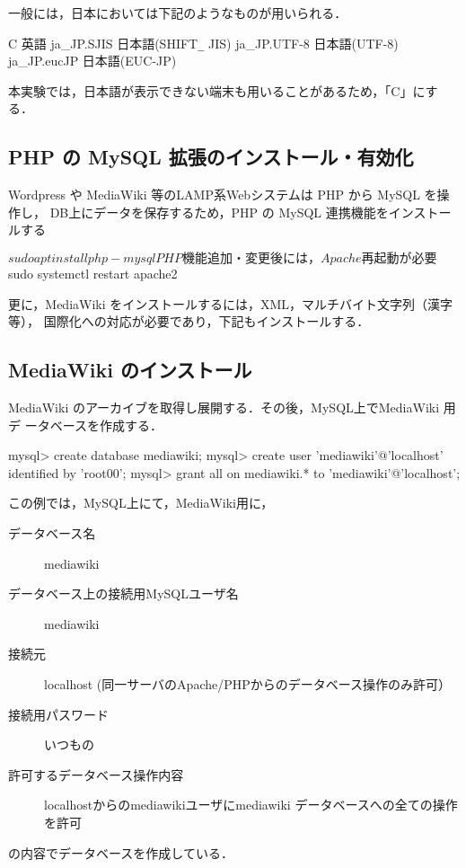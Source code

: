 一般には，日本においては下記のようなものが用いられる．

\begin{cli}
C               英語
ja_JP.SJIS      日本語(SHIFT\verb+_+ JIS)
ja_JP.UTF-8     日本語(UTF-8)
ja_JP.eucJP     日本語(EUC-JP)
\end{cli}

本実験では，日本語が表示できない端末も用いることがあるため，「C」にする．



\subsection{PHP の MySQL 拡張のインストール・有効化}

Wordpress や MediaWiki 等のLAMP系Webシステムは PHP から MySQL を操作し，
DB上にデータを保存するため，PHP の MySQL 連携機能をインストールする

\begin{cli}
$ sudo apt install php-mysql

PHP機能追加・変更後には，Apache 再起動が必要

$ sudo systemctl restart apache2

\end{cli}

更に，MediaWiki をインストールするには，XML，マルチバイト文字列（漢字等），
国際化への対応が必要であり，下記もインストールする．


\subsection{MediaWiki のインストール}

MediaWiki のアーカイブを取得し展開する．その後，MySQL上でMediaWiki 用デ
ータベースを作成する．
\begin{cli}
mysql> create database mediawiki;
mysql> create user 'mediawiki'@'localhost' identified by 'root00';
mysql> grant all on mediawiki.* to 'mediawiki'@'localhost';
\end{cli}
この例では，MySQL上にて，MediaWiki用に，
\begin{description}
 \item[データベース名] mediawiki
 \item[データベース上の接続用MySQLユーザ名] mediawiki
 \item[接続元] localhost (同一サーバのApache/PHPからのデータベース操作のみ許可）
 \item[接続用パスワード] いつもの
 \item[許可するデータベース操作内容] localhostからのmediawikiユーザにmediawiki データベースへの全ての操作を許可
\end{description}
の内容でデータベースを作成している．

